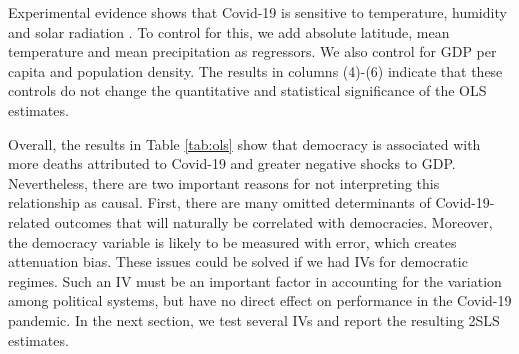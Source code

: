 Experimental evidence shows that Covid-19 is sensitive to temperature, humidity and solar radiation \citep{chin}. To control for this, we add absolute latitude, mean temperature and mean precipitation as regressors. We also control for GDP per capita and population density. The results in columns (4)-(6) indicate that these controls do not change the quantitative and statistical significance of the OLS estimates. 

Overall, the results in Table \ref{tab:ols} show that democracy is associated with more deaths attributed to Covid-19 and greater negative shocks to GDP. Nevertheless, there are two important reasons for not interpreting this relationship as causal. First, there are many omitted determinants of Covid-19-related outcomes that will naturally be correlated with democracies. Moreover, the democracy variable is likely to be measured with error, which creates attenuation bias. These issues could be solved if we had IVs for democratic regimes. Such an IV must be an important factor in accounting for the variation among political systems, but have no direct effect on performance in the Covid-19 pandemic. In the next section, we test several IVs and report the resulting 2SLS estimates.

